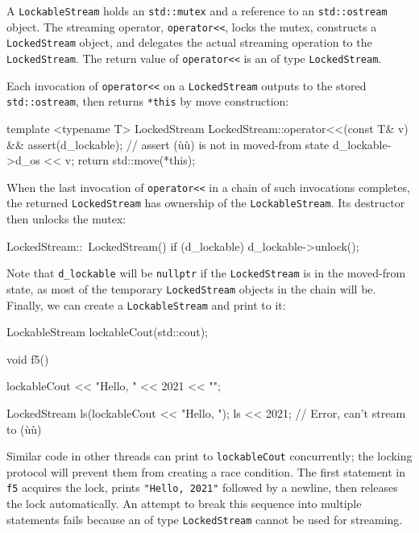 \noindent A \lstinline!LockableStream! holds an \lstinline!std::mutex! and a reference
to an \lstinline!std::ostream! object. The streaming operator,
\lstinline!operator<<!, locks the mutex, constructs a \lstinline!LockedStream!
object, and delegates the actual streaming operation to the
\lstinline!LockedStream!. The return value of \lstinline!operator<<! is an
 of type \lstinline!LockedStream!.

Each invocation of \lstinline!operator<<! on a \lstinline!LockedStream!
outputs to the stored \lstinline!std::ostream!, then returns \lstinline!*this!
by move construction:

\begin{emcppslisting}[emcppsbatch=e5]
template <typename T>
LockedStream LockedStream::operator<<(const T& v) &&
{
    assert(d_lockable);  // assert (ù{}ù) is not in moved-from state
    d_lockable->d_os << v;
    return std::move(*this);
}
\end{emcppslisting}
    

\noindent When the last invocation of \lstinline!operator<<! in a chain of such
invocations completes, the returned \lstinline!LockedStream! has ownership
of the \lstinline!LockableStream!. Its destructor then unlocks the mutex:

\begin{emcppslisting}[emcppsbatch=e5]
LockedStream::~LockedStream()
{
    if (d_lockable)
    {
        d_lockable->unlock();
    }
}
\end{emcppslisting}
    

\noindent Note that \lstinline!d_lockable! will be \lstinline!nullptr! if the
\lstinline!LockedStream! is in the moved-from state, as most of the
temporary \lstinline!LockedStream! objects in the chain will be. Finally,
we can create a \lstinline!LockableStream! and print to it:

\begin{emcppslisting}[emcppsbatch=e5]
LockableStream lockableCout(std::cout);

void f5()
{
    lockableCout << "Hello, " << 2021 << "\n";

    LockedStream ls(lockableCout << "Hello, ");
    ls << 2021;  // Error, can't stream to (ù{}ù)
}
\end{emcppslisting}
    

\noindent Similar code in other threads can print to \lstinline!lockableCout!
concurrently; the locking protocol will prevent them from creating a
race condition. The first statement in \lstinline!f5! acquires the lock,
prints \lstinline!"Hello,!~\lstinline!2021"! followed by a newline, then
releases the lock automatically. An attempt to break this sequence into
multiple statements fails because an  of type
\lstinline!LockedStream! cannot be used for streaming.

